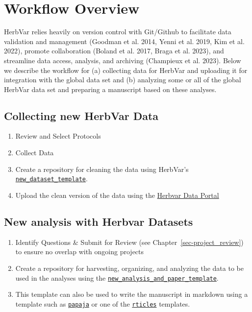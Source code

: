 \documentclass[
  letterpaper,
  oneside,
  open=any]{scrbook}
\providecommand{\tightlist}{%
  \setlength{\itemsep}{0pt}\setlength{\parskip}{0pt}}\usepackage{longtable,booktabs,array}
\begin{document}
\chapter{Workflow Overview}\label{sec-workflow}

HerbVar relies heavily on version control with Git/Github to facilitate
data validation and management (Goodman et al. 2014, Yenni et al. 2019,
Kim et al. 2022), promote collaboration (Boland et al. 2017, Braga et
al. 2023), and streamline data access, analysis, and archiving
(Champieux et al. 2023). Below we describe the workflow for (a)
collecting data for HerbVar and uploading it for integration with the
global data set and (b) analyzing some or all of the global HerbVar data
set and preparing a manuscript based on these analyses.

\section{Collecting new HerbVar Data}\label{collecting-new-herbvar-data}

\begin{enumerate}
\def\labelenumi{\arabic{enumi}.}
\tightlist
\item
  Review and Select Protocols
\item
  Collect Data
\item
  Create a repository for cleaning the data using HerbVar's
  \href{https://github.com/HerbVar-Network/new_dataset_template}{\texttt{new\_dataset\_template}}.
\item
  Upload the clean version of the data using the
  \href{https://herbvar.shinyapps.io/data_portal_actual/}{Herbvar Data
  Portal}
\end{enumerate}

\section{New analysis with Herbvar
Datasets}\label{new-analysis-with-herbvar-datasets}

\begin{enumerate}
\def\labelenumi{\arabic{enumi}.}
\tightlist
\item
  Identify Questions \& Submit for Review (see
  Chapter~\ref{sec-project_review}) to ensure no overlap with ongoing
  projects\\
\item
  Create a repository for harvesting, organizing, and analyzing the data
  to be used in the analyses using the
  \href{https://github.com/HerbVar-Network/analysis_and_paper_template}{\texttt{new\_analysis\_and\_paper\_template}}.
\item
  This template can also be used to write the manuscript in markdown
  using a template such as
  \href{https://github.com/crsh/papaja}{\texttt{papaja}} or one of the
  \href{https://github.com/rstudio/rticles}{\texttt{rticles}} templates.
\end{enumerate}
\end{document}
